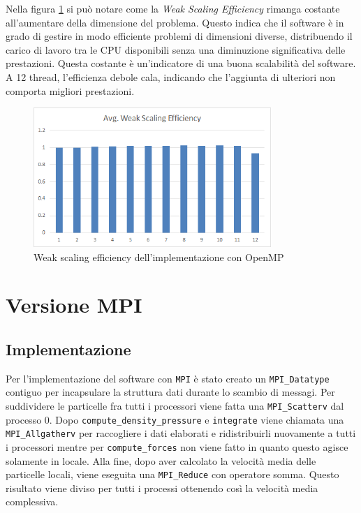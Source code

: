 \documentclass[a4paper, 12pt]{report}
\begin{document}
\begin{sloppypar}
  \bigskip
  \noindent
  Nella figura \ref{fig:omp_wse} si può notare come la \textit{Weak Scaling Efficiency} rimanga costante 
  all'aumentare della dimensione del problema. Questo indica che il software è in grado di gestire in 
  modo efficiente problemi di dimensioni diverse, distribuendo il carico di lavoro tra le CPU disponibili 
  senza una diminuzione significativa delle prestazioni. Questa costante è un'indicatore
  di una buona scalabilità del software. A 12 thread, l'efficienza debole cala, indicando che l'aggiunta di ulteriori
  non comporta migliori prestazioni.


  \begin{figure}[ht]
    \centering
    \includegraphics[width=9cm]{img/omp-wse.png}
    \caption{Weak scaling efficiency dell'implementazione con OpenMP}
    \label{fig:omp_wse}
  \end{figure}
\end{sloppypar}

{\let\clearpage\relax\chapter*{Versione MPI}}
\section*{Implementazione}
Per l'implementazione del software con \texttt{MPI} è stato creato un \texttt{MPI\_Datatype} contiguo per incapsulare la struttura
dati durante lo scambio di messagi. Per suddividere le particelle fra tutti i processori viene fatta una \texttt{MPI\_Scatterv} dal processo 0.
Dopo \texttt{compute\_density\_pressure} e \texttt{integrate} viene chiamata una \texttt{MPI\_Allgatherv} per raccogliere i dati elaborati
e ridistribuirli nuovamente a tutti i processori mentre per \texttt{compute\_forces} non viene fatto in quanto questo agisce solamente in locale.
Alla fine, dopo aver calcolato la velocità media delle particelle locali, viene eseguita una \texttt{MPI\_Reduce} con operatore somma.
Questo risultato viene diviso per tutti i processi ottenendo così la velocità media complessiva.
\end{document}
